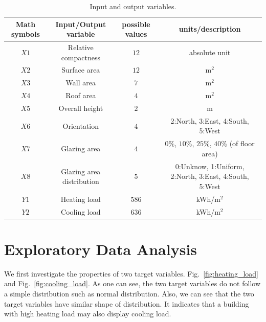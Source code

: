 \documentclass{article}
\begin{document}
\begin{table}[!htbp]
\centering 
\captionsetup{font=footnotesize}
\caption{Input and output variables.}
 \begin{tabular}{*{4}c}
\hline \hline
Math symbols & Input/Output variable & possible values &  units/description \\
\hline
$X1 $ & Relative compactness &   $12$ & absolute unit   \\
$X2$ & Surface area & $12$ &  m$^2$ \\
$X3$  &  Wall area  &   $7$ &  m$^2$   \\
$X4$  &  Roof area  &   $4$ &  m$^2$   \\
$X5$  &  Overall height  &   $2$ &  m   \\
$X6$  &  Orientation  &   $4$ &  2:North, 3:East, 4:South, 5:West   \\
$X7$  &  Glazing area  &   $4$ &  $0\%$, $10\%$, $25\%$, $40\%$ (of floor area)   \\
$X8$  &  Glazing area distribution  &   $5$ &  0:Unknow, 1:Uniform, 2:North, 3:East, 4:South, 5:West   \\
$Y1$  &  Heating load  &   $586$ &  kWh/m$^2$   \\
$Y2$  &  Cooling load  &   $636$ &  kWh/m$^2$   \\
\hline \hline
\end{tabular}
\label{tab:feature}
\end{table}


\section{Exploratory Data Analysis \label{sec:eda}}

We first investigate the properties of two target variables. Fig.~\ref{fig:heating_load} and Fig.~\ref{fig:cooling_load}. As one can see, the two target variables do not follow a simple distribution such as normal distribution. Also, we can see that the two target variables have similar shape of distribution. It indicates that a building with high heating load may also display cooling load.
\end{document}
